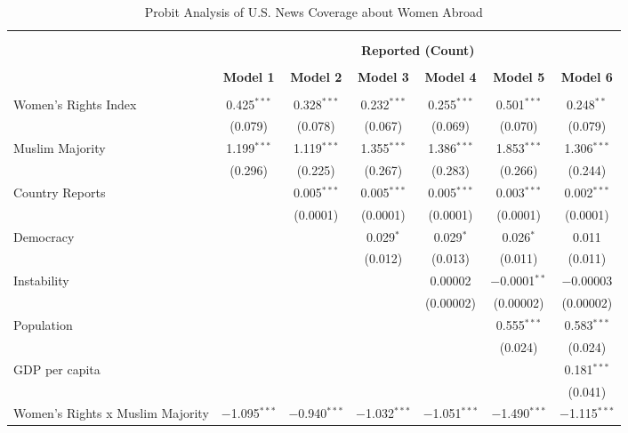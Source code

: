 
\begin{table}[!htbp] \centering 
  \caption{Probit Analysis of U.S. News Coverage about Women Abroad} 
  \label{table:negbin-part} 
\begin{tabular}{@{\extracolsep{5pt}}lcccccc} 
\\[-1.8ex]\hline \\[-1.8ex] 
\\[-1.8ex] & \multicolumn{6}{c}{\textbf{Reported (Count)}} \\ 
\\[-1.8ex] & \textbf{Model 1} & \textbf{Model 2} & \textbf{Model 3} & \textbf{Model 4} & \textbf{Model 5} & \textbf{Model 6}\\ 
\hline \\[-1.8ex] 
 Women's Rights Index & 0.425$^{***}$ & 0.328$^{***}$ & 0.232$^{***}$ & 0.255$^{***}$ & 0.501$^{***}$ & 0.248$^{**}$ \\ 
  & (0.079) & (0.078) & (0.067) & (0.069) & (0.070) & (0.079) \\ 
  Muslim Majority & 1.199$^{***}$ & 1.119$^{***}$ & 1.355$^{***}$ & 1.386$^{***}$ & 1.853$^{***}$ & 1.306$^{***}$ \\ 
  & (0.296) & (0.225) & (0.267) & (0.283) & (0.266) & (0.244) \\ 
  Country Reports &  & 0.005$^{***}$ & 0.005$^{***}$ & 0.005$^{***}$ & 0.003$^{***}$ & 0.002$^{***}$ \\ 
  &  & (0.0001) & (0.0001) & (0.0001) & (0.0001) & (0.0001) \\ 
  Democracy &  &  & 0.029$^{*}$ & 0.029$^{*}$ & 0.026$^{*}$ & 0.011 \\ 
  &  &  & (0.012) & (0.013) & (0.011) & (0.011) \\ 
  Instability &  &  &  & 0.00002 & $-$0.0001$^{**}$ & $-$0.00003 \\ 
  &  &  &  & (0.00002) & (0.00002) & (0.00002) \\ 
  Population &  &  &  &  & 0.555$^{***}$ & 0.583$^{***}$ \\ 
  &  &  &  &  & (0.024) & (0.024) \\ 
  GDP per capita &  &  &  &  &  & 0.181$^{***}$ \\ 
  &  &  &  &  &  & (0.041) \\ 
  Women's Rights x Muslim Majority & $-$1.095$^{***}$ & $-$0.940$^{***}$ & $-$1.032$^{***}$ & $-$1.051$^{***}$ & $-$1.490$^{***}$ & $-$1.115$^{***}$ \\ 

\end{tabular}
\end{table}
